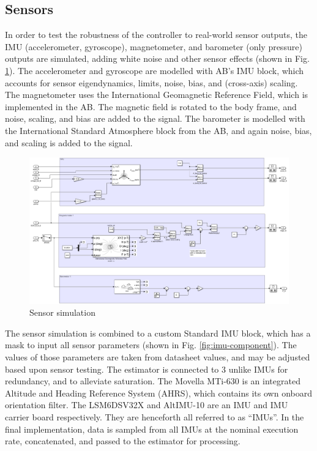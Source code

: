\subsection{Sensors}
In order to test the robustness of the controller to real-world sensor outputs, the IMU (accelerometer, gyroscope), magnetometer, and barometer (only pressure) outputs are simulated, adding white noise and other sensor effects (shown in Fig. \ref{fig:imu-subsystem}).
The accelerometer and gyroscope are modelled with AB's IMU block, which accounts for sensor eigendynamics, limits, noise, bias, and (cross-axis) scaling.
The magnetometer uses the International Geomagnetic Reference Field, which is implemented in the AB.
The magnetic field is rotated to the body frame, and noise, scaling, and bias are added to the signal. 
The barometer is modelled with the International Standard Atmosphere block from the AB, and again noise, bias, and scaling is added to the signal.

\begin{figure}[ht]
    \centering
    \includegraphics[width=0.7\linewidth]{images-plant/sim_imu.png}
    \caption{Sensor simulation}
    \label{fig:imu-subsystem}
\end{figure}

The sensor simulation is combined to a custom Standard IMU block, which has a mask to input all sensor parameters (shown in Fig. \ref{fig:imu-component}).
The values of those parameters are taken from datasheet values, and may be adjusted based upon sensor testing.
The estimator is connected to 3 unlike IMUs for redundancy, and to alleviate saturation. The Movella MTi-630 is an integrated Altitude and Heading Reference System (AHRS), which contains its own onboard orientation filter. 
The LSM6DSV32X and AltIMU-10 are an IMU and IMU carrier board respectively. They are henceforth all referred to as ``IMUs''. In the final implementation, data is sampled from all IMUs at the nominal execution rate, concatenated, and passed to the estimator for processing.

